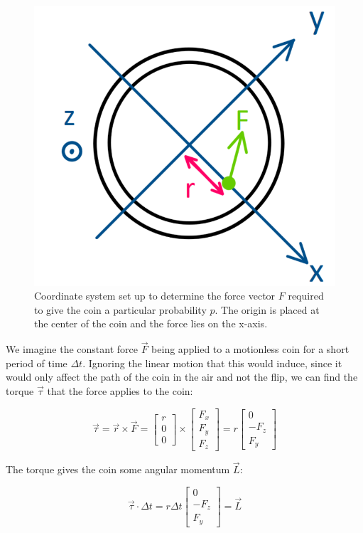 \documentclass[english,12pt,a4paper,final]{article}
\begin{document}
\begin{figure}[H]
	\centering
	\includegraphics[width=0.7\linewidth]{coinCoords}
	\caption{Coordinate system set up to determine the force vector $F$ required to give the coin a particular probability $p$. The origin is placed at the center of the coin and the force lies on the x-axis.}
	\label{fig:coincoords}
\end{figure}

We imagine the constant force $\vec{F}$ being applied to a motionless coin for a short period of time $\Delta t$. Ignoring the linear motion that this would induce, since it would only affect the path of the coin in the air and not the flip, we can find the torque $\vec{\tau}$ that the force applies to the coin:

\begin{equation*}
	\vec{\tau} = \vec{r}\times\vec{F} = \begin{bmatrix}r\\0\\0\end{bmatrix} \times \begin{bmatrix}F_x \\ F_y \\ F_z\end{bmatrix} = r\begin{bmatrix}0\\-F_z\\F_y\end{bmatrix}
\end{equation*}

The torque gives the coin some angular momentum $\vec{L}$:

\begin{equation*}
	\vec{\tau} \cdot \Delta t = r \Delta t\begin{bmatrix}0\\- F_z \\ F_y \end{bmatrix} = \vec{L}
\end{equation*}
\end{document}
